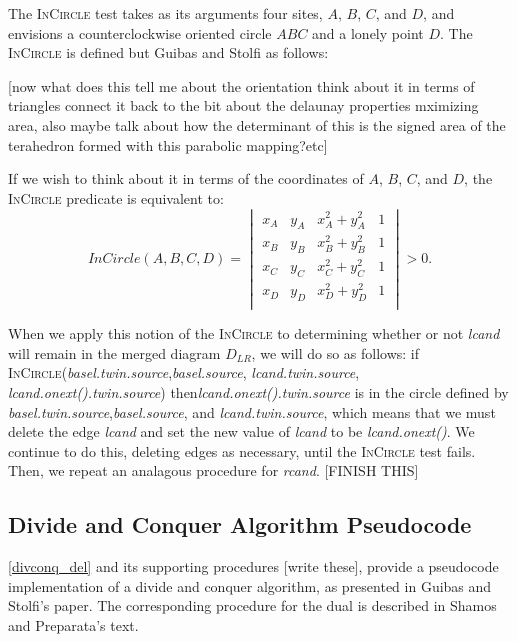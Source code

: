\documentclass[12pt,twoside]{reedthesis}
\begin{document}
  The \textsc{InCircle} test takes as its arguments four sites, $A$, $B$, $C$, and $D$, and envisions a counterclockwise oriented circle $ABC$  and a lonely point $D$. The \textsc{InCircle} is defined but Guibas and Stolfi as follows: 
  
  [now what does this tell me about the orientation
  think about it in terms of triangles connect it back to the bit about the delaunay properties mximizing area, also maybe talk about how the determinant of this is the signed area of the terahedron formed with this parabolic mapping?etc]

  If we wish to think about it in terms of the coordinates of $A$, $B$, $C$, and $D$, the \textsc{InCircle} predicate is equivalent to:
  $$
  InCircle(A,B,C,D) =
  \begin{vmatrix}
  x_{A} & y_{A} & x_{A}^2 + y_{A}^2 & 1 \\
  x_{B} & y_{B} & x_{B}^2 + y_{B}^2 & 1 \\
  x_{C} & y_{C} & x_{C}^2 + y_{C}^2 & 1 \\  
  x_{D} & y_{D} & x_{D}^2 + y_{D}^2 & 1 \\  
  \end{vmatrix} > 0.
  $$  

  When we apply this notion of the \textsc{InCircle} to determining whether or not \emph{lcand} will remain in the merged diagram $D_{LR}$, we will do so as follows: if \textsc{InCircle}(\emph{basel.twin.source},\emph{basel.source}, \emph{lcand.twin.source}, \emph{lcand.onext().twin.source}) then\emph{lcand.onext().twin.source} is in the circle defined by \emph{basel.twin.source},\emph{basel.source}, and \emph{lcand.twin.source}, which means that we must delete the edge \emph{lcand} and set the new value of \emph{lcand} to be \emph{lcand.onext()}. We continue to do this, deleting edges as necessary, until the \textsc{InCircle} test fails. Then, we repeat an analagous procedure for \emph{rcand}. [FINISH THIS]

  \subsection{Divide and Conquer Algorithm Pseudocode} %
  \label{sub:divide_and_conquer_algorithm_pseudocode}
  \cref{divconq_del} and its supporting procedures [write these], provide a pseudocode implementation of a divide and conquer algorithm, as presented in Guibas and Stolfi's paper. The corresponding procedure for the dual is described in Shamos and Preparata's text. 
  
\end{document}
